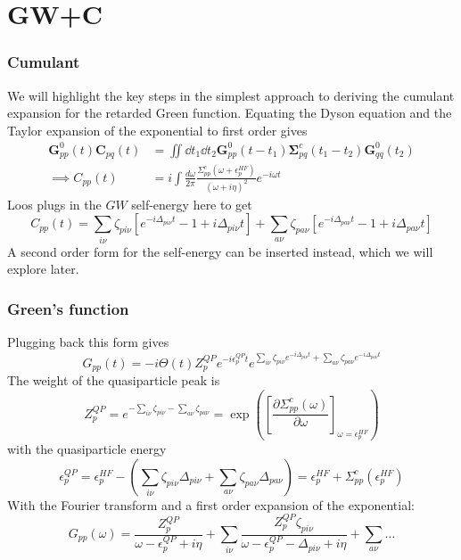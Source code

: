 
\section{GW+C}
\begin{frame}
    \frametitle{Cumulant}

We will highlight the key steps in the simplest approach to deriving the cumulant expansion for the retarded Green function. Equating the Dyson equation and the Taylor expansion of the exponential to first order gives
\begin{align}
    \bm{G}_{pp}^{0}(t) \bm{C}_{pq}(t) &= {\iint \dd t_1 \dd t_2 \bm{G}_{pp}^{0}(t-t_1) \bm{\Sigma}_{pq}^c(t_1 - t_2) \bm{G}_{qq}^{0}(t_2)} \\
\implies C_{pp}(t) &= i \int \frac{d\omega}{2\pi} \frac{ \Sigma_{pp}^c\left(\omega+\epsilon_p^{HF}\right)}{(\omega + i \eta)^2} e^{-i \omega t}
\end{align}
Loos plugs in the $GW$ self-energy here to get
\begin{equation}
    C_{pp}(t) = \sum_{i\nu} \zeta_{pi\nu} \left[ e^{-i\Delta_{pi\nu} t} - 1 + i\Delta_{pi\nu} t \right] + \sum_{a\nu} \zeta_{pa\nu} \left[ e^{-i\Delta_{pa\nu} t} - 1 + i\Delta_{pa\nu} t \right]
\end{equation}
A second order form for the self-energy can be inserted instead, which we will explore later.

\end{frame}

\begin{frame}
    \frametitle{Green's function}
Plugging back this form gives
\begin{equation}
    G_{pp}(t) = -i \Theta(t) Z_p^{QP} e^{-i \epsilon_p^{QP} t} e^{\sum_{i\nu} \zeta_{pi\nu} e^{-i\Delta_{pi\nu} t} + \sum_{a\nu} \zeta_{pa\nu} e^{-i\Delta_{pa\nu} t}}
\end{equation}
The weight of the quasiparticle peak is
\begin{equation}
    Z_p^{QP} = e^{-\sum_{i\nu} \zeta_{pi\nu} - \sum_{a\nu} \zeta_{pa\nu}} = \exp\left(\left[\frac{\partial \Sigma_{pp}^c(\omega)}{\partial \omega}\right]_{\omega = \epsilon_p^{HF}}\right)
\end{equation}
with the quasiparticle energy
\begin{equation}
    \epsilon_p^{QP} = \epsilon_p^{HF} - \left(\sum_{i\nu} \zeta_{pi\nu} \Delta_{pi\nu} + \sum_{a\nu} \zeta_{pa\nu} \Delta_{pa\nu}\right) = \epsilon_p^{HF} + \Sigma_{pp}^c\left(\epsilon_p^{HF}\right)
\end{equation}
With the Fourier transform and a first order expansion of the exponential:
\begin{equation}
    G_{pp}(\omega) = \frac{Z_p^{QP}}{\omega - \epsilon_p^{QP} + i\eta} + \sum_{i\nu} \frac{Z_p^{QP} \zeta_{pi\nu}}{\omega - \epsilon_p^{QP} - \Delta_{pi\nu} + i\eta} + \sum_{a\nu}  \ldots
\end{equation}



\end{frame}

